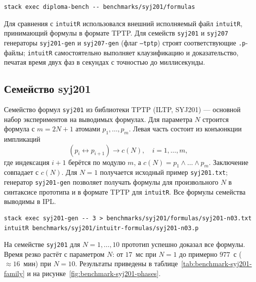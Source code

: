 \documentclass[14pt, russian]{scrartcl}
\begin{document}
\begin{listing}[!htb]
\caption{Запуск бенчмарка разработанного доказателя}
\label{lst:benchmark-command}
\begin{verbatim}
stack exec diploma-bench -- benchmarks/syj201/formulas
\end{verbatim}
\end{listing}

Для сравнения с \texttt{intuitR} использовался внешний исполняемый файл
\texttt{intuitR}, принимающий формулы в формате TPTP. Для семейств
\texttt{syj201} и \texttt{syj207} генераторы \texttt{syj201-gen} и
\texttt{syj207-gen} (флаг \texttt{---tptp}) строят соответствующие
\texttt{.p}-файлы; \texttt{intuitR} самостоятельно выполняет клаузификацию и
доказательство, печатая время двух фаз в секундах с точностью до миллисекунды.

\subsection{Семейство syj201}

Семейство формул \texttt{syj201} из библиотеки TPTP (ILTP, SYJ201) --- основной
набор экспериментов на выводимых формулах. Для параметра $N$ строится формула
с $m = 2N + 1$ атомами $p_1, \ldots, p_m$. Левая часть состоит из конъюнкции
импликаций
\[
  (p_i \leftrightarrow p_{i+1}) \rightarrow c(N), \quad i = 1, \ldots, m,
\]
где индексация $i+1$ берётся по модулю $m$, а $c(N) = p_1 \land \ldots \land p_m$.
Заключение совпадает с $c(N)$. Для $N = 1$ получается исходный пример
\texttt{syj201.txt}; генератор \texttt{syj201-gen} позволяет получать формулы
для произвольного $N$ в синтаксисе прототипа и в формате TPTP для
\texttt{intuitR}. Все формулы семейства выводимы в IPL.

\begin{listing}[!htb]
\caption{Генерация семейства syj201 и запуск intuitR}
\label{lst:syj201-gen-intuitr}
\begin{verbatim}
stack exec syj201-gen -- 3 > benchmarks/syj201/formulas/syj201-n03.txt
intuitR benchmarks/syj201/intuitr-formulas/syj201-n03.p
\end{verbatim}
\end{listing}

На семействе \texttt{syj201} для $N = 1, \ldots, 10$ прототип успешно доказал
все формулы. Время резко растёт с параметром $N$: от $17$~мс при $N = 1$ до
примерно $977$~с ($\approx 16$~мин) при $N = 10$. Результаты приведены в
таблице~\ref{tab:benchmark-syj201-family} и на рисунке~\ref{fig:benchmark-syj201-phases}.
\end{document}

